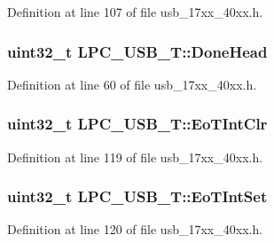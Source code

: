 Definition at line 107 of file usb\+\_\+17xx\+\_\+40xx.\+h.

\subsubsection[{\texorpdfstring{Done\+Head}{DoneHead}}]{ uint32\+\_\+t L\+P\+C\+\_\+\+U\+S\+B\+\_\+\+T\+::\+Done\+Head}\hypertarget{structLPC__USB__T_a2f93576ce98cbc8631f4aa19f4752dae}{}\label{structLPC__USB__T_a2f93576ce98cbc8631f4aa19f4752dae}


Definition at line 60 of file usb\+\_\+17xx\+\_\+40xx.\+h.

\subsubsection[{\texorpdfstring{Eo\+T\+Int\+Clr}{EoTIntClr}}]{ uint32\+\_\+t L\+P\+C\+\_\+\+U\+S\+B\+\_\+\+T\+::\+Eo\+T\+Int\+Clr}\hypertarget{structLPC__USB__T_aed992717f3ed2c976865839507a8cc1a}{}\label{structLPC__USB__T_aed992717f3ed2c976865839507a8cc1a}


Definition at line 119 of file usb\+\_\+17xx\+\_\+40xx.\+h.

\subsubsection[{\texorpdfstring{Eo\+T\+Int\+Set}{EoTIntSet}}]{ uint32\+\_\+t L\+P\+C\+\_\+\+U\+S\+B\+\_\+\+T\+::\+Eo\+T\+Int\+Set}\hypertarget{structLPC__USB__T_a705076288086e35d1221ec7094f1cc48}{}\label{structLPC__USB__T_a705076288086e35d1221ec7094f1cc48}


Definition at line 120 of file usb\+\_\+17xx\+\_\+40xx.\+h.

